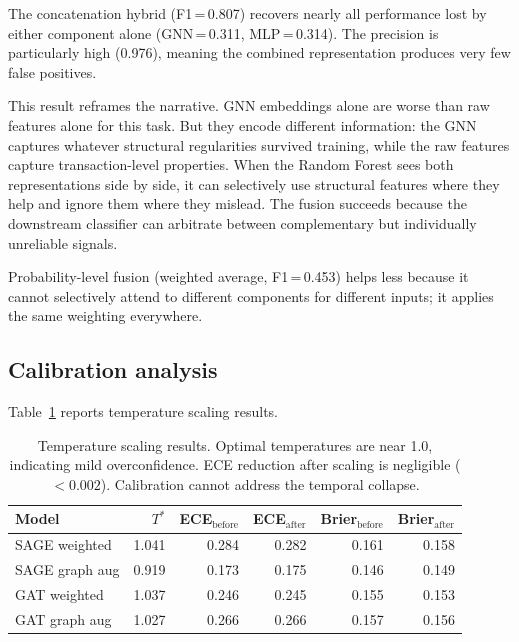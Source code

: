 The concatenation hybrid (F1\,=\,0.807) recovers nearly all
performance lost by either component alone (GNN\,=\,0.311,
MLP\,=\,0.314).  The precision is particularly high (0.976), meaning
the combined representation produces very few false positives.

This result reframes the narrative.  GNN embeddings alone are worse
than raw features alone for this task.  But they encode different
information: the GNN captures whatever structural regularities survived
training, while the raw features capture transaction-level properties.
When the Random Forest sees both representations side by side, it can
selectively use structural features where they help and ignore them
where they mislead.  The fusion succeeds because the downstream
classifier can arbitrate between complementary but individually
unreliable signals.

Probability-level fusion (weighted average, F1\,=\,0.453) helps less
because it cannot selectively attend to different components for
different inputs; it applies the same weighting everywhere.

\subsection{Calibration analysis}
\label{sec:calibration}

Table~\ref{tab:calibration} reports temperature scaling results.

\begin{table}[!htbp]
\centering
\caption{Temperature scaling results.  Optimal temperatures are near
  1.0, indicating mild overconfidence.  ECE reduction after scaling
  is negligible ($< 0.002$).  Calibration cannot address the temporal
  collapse.}
\label{tab:calibration}
\small
\begin{tabular}{lrrrrr}
\toprule
\textbf{Model} & \textbf{$T^*$} & \textbf{ECE$_\text{before}$}
  & \textbf{ECE$_\text{after}$} & \textbf{Brier$_\text{before}$}
  & \textbf{Brier$_\text{after}$} \\
\midrule
SAGE weighted   & 1.041 & 0.284 & 0.282 & 0.161 & 0.158 \\
SAGE graph aug  & 0.919 & 0.173 & 0.175 & 0.146 & 0.149 \\
GAT weighted    & 1.037 & 0.246 & 0.245 & 0.155 & 0.153 \\
GAT graph aug   & 1.027 & 0.266 & 0.266 & 0.157 & 0.156 \\
\bottomrule
\end{tabular}
\end{table}

